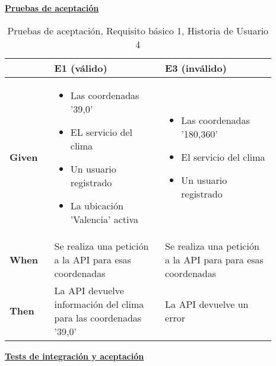 \documentclass[../ei103948-project-documentation.tex]{subfiles}
\begin{document}
\begin{center}
				\textbf{\underline{Pruebas de aceptación}}
				\begin{table}[H]
					\centering
					\begin{tabular}{|p{0.15\linewidth}|p{0.37\linewidth}|p{0.37\linewidth}|}
						\hline
						\textbf{}      & \textbf{E1 (válido)}                                   & \textbf{E3 (inválido)}                                      \\ \hline
						\textbf{Given} & \begin{itemize}\vspace{-5mm}\setlength\itemsep{0mm}\setlength\parskip{0mm}\setlength{\itemindent}{-5mm}
							\item Las coordenadas '39,0'
							\item EL servicio del clima
							\item Un usuario registrado
							\item La ubicación 'Valencia' activa
						\end{itemize} & 
						\begin{itemize}\vspace{-5mm}\setlength\itemsep{0mm}\setlength\parskip{0mm}\setlength{\itemindent}{-5mm}
							\item Las coordenadas '180,360'
							\item El servicio del clima
							\item Un usuario registrado
						\end{itemize} \\ \hline
						\textbf{When}  & Se realiza una petición a la API para esas coordenadas & Se realiza una petición a la API para para esas coordenadas \\ \hline
						\textbf{Then}  & La API devuelve información del clima para las coordenadas '39,0'                            & La API devuelve un error                                    \\ \hline
						\end{tabular}
					\caption{Pruebas de aceptación, Requisito básico 1, Historia de Usuario 4}
				\end{table}
				\end{center}

				\newpage

				\begin{center}
					\textbf{\underline{Tests de integración y aceptación}}
				\end{center}

				\testBasicoD


				\vspace*{5mm}
\end{document}
